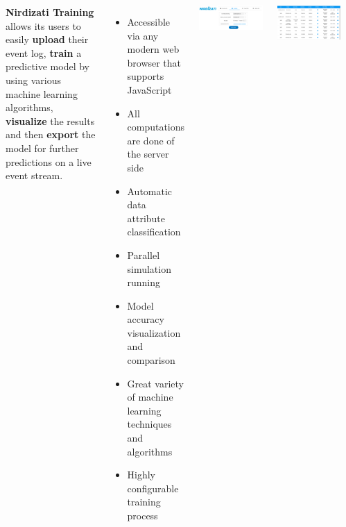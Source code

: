 \documentclass[24pt, a0paper, landscape]{tikzposter}
\begin{document}
\begin{columns}
{\begin{multicols}{2}
        \end{multicols}

        }


        {
        \textbf{Nirdizati Training} allows its users to easily \textbf{upload} their event log, \textbf{train}
        a predictive model by using various machine learning algorithms, \textbf{visualize} the results
        and then \textbf{export} the model for further predictions on a live event stream.
        }

        {
        \begin{itemize}
            \item Accessible via any modern web browser that supports JavaScript
            \item All computations are done of the server side
            \item Automatic data attribute classification
            \item Parallel simulation running
            \item Model accuracy visualization and comparison
            \item Great variety of machine learning techniques and algorithms
            \item Highly configurable training process
        \end{itemize}
        }

        {
        \begin{tikzfigure}
            \includegraphics{figures/training.png}
        \end{tikzfigure}

        \begin{tikzfigure}
            \includegraphics{figures/validation.png}
        \end{tikzfigure}

}
\end{columns}
\end{document}
